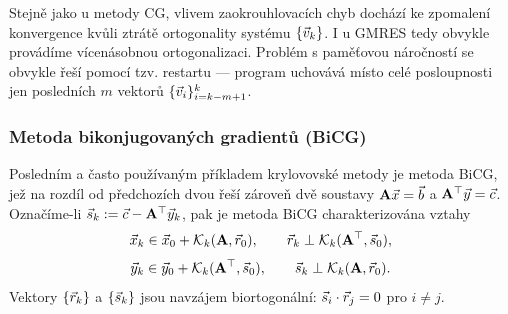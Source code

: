 % 

Stejně jako u metody CG, vlivem zaokrouhlovacích chyb dochází ke zpomalení konvergence kvůli ztrátě ortogonality systému $\{\vv_k\}$.
I u GMRES tedy obvykle provádíme vícenásobnou ortogonalizaci.
Problém s paměťovou náročností se obvykle řeší pomocí tzv. restartu --- program uchovává místo celé posloupnosti jen posledních $m$ vektorů $\{\vv_i\}_{i=k-m+1}^k$.




\subsubsection{Metoda bikonjugovaných gradientů (BiCG)}
Posledním a často používaným příkladem krylovovské metody je metoda BiCG, jež na rozdíl od předchozích dvou řeší zároveň dvě soustavy $\A\xx=\bb$ a $\A^\top\yy=\cc$.
Označíme-li $\ss_k:=\cc-\A^\top\yy_k$, pak je metoda BiCG charakterizována vztahy
$$ \xx_k\in\xx_0+\mathcal K_k(\A,\rr_0),\qquad \rr_k\perp\mathcal K_k(\A^\top,\ss_0), $$
$$ \yy_k\in\yy_0+\mathcal K_k(\A^\top,\ss_0),\qquad \ss_k\perp\mathcal K_k(\A,\rr_0). $$
Vektory $\{\rr_k\}$ a $\{\ss_k\}$ jsou navzájem biortogonální: $\ss_i\cdot\rr_j=0$ pro $i\neq j$.


